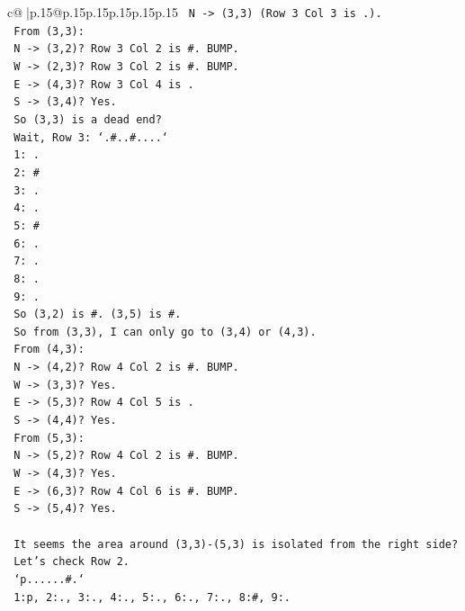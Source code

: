 \documentclass{article}
\begin{document}
{\begin{supertabular}{c@{$\;$}|p{.15\linewidth}@{}p{.15\linewidth}p{.15\linewidth}p{.15\linewidth}p{.15\linewidth}p{.15\linewidth}}
{{{\texttt{   N {-}> (3,3) (Row 3 Col 3 is .).} \\
\texttt{   From (3,3):} \\
\texttt{   N {-}> (3,2)? Row 3 Col 2 is \#. BUMP.} \\
\texttt{   W {-}> (2,3)? Row 3 Col 2 is \#. BUMP.} \\
\texttt{   E {-}> (4,3)? Row 3 Col 4 is .} \\
\texttt{   S {-}> (3,4)? Yes.} \\
\texttt{   So (3,3) is a dead end?} \\
\texttt{   Wait, Row 3: `.\#..\#....`} \\
\texttt{   1: .} \\
\texttt{   2: \#} \\
\texttt{   3: .} \\
\texttt{   4: .} \\
\texttt{   5: \#} \\
\texttt{   6: .} \\
\texttt{   7: .} \\
\texttt{   8: .} \\
\texttt{   9: .} \\
\texttt{   So (3,2) is \#. (3,5) is \#.} \\
\texttt{   So from (3,3), I can only go to (3,4) or (4,3).} \\
\texttt{   From (4,3):} \\
\texttt{   N {-}> (4,2)? Row 4 Col 2 is \#. BUMP.} \\
\texttt{   W {-}> (3,3)? Yes.} \\
\texttt{   E {-}> (5,3)? Row 4 Col 5 is .} \\
\texttt{   S {-}> (4,4)? Yes.} \\
\texttt{   From (5,3):} \\
\texttt{   N {-}> (5,2)? Row 4 Col 2 is \#. BUMP.} \\
\texttt{   W {-}> (4,3)? Yes.} \\
\texttt{   E {-}> (6,3)? Row 4 Col 6 is \#. BUMP.} \\
\texttt{   S {-}> (5,4)? Yes.} \\
\\ 
\texttt{   It seems the area around (3,3){-}(5,3) is isolated from the right side?} \\
\texttt{   Let's check Row 2.} \\
\texttt{   `p......\#.`} \\
\texttt{   1:p, 2:., 3:., 4:., 5:., 6:., 7:., 8:\#, 9:.} \\
}}}
\end{supertabular}}
\end{document}

